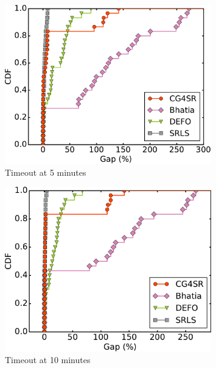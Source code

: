 \begin{figure}
\begin{center}
\includegraphics[width=0.8\textwidth]{images/solver_gap_optim_300-6.2016RocketFuelUCL.cdfs.pdf}
\caption{Timeout at 5 minutes}
\label{fig:anytime:5min}
\end{center}
\end{figure}

\begin{figure}
\begin{center}
\includegraphics[width=0.8\textwidth]{images/solver_gap_optim_600-6.2016RocketFuelUCL.cdfs.pdf}
\caption{Timeout at 10 minutes}
\label{fig:anytime:10min}
\end{center}
\end{figure}


